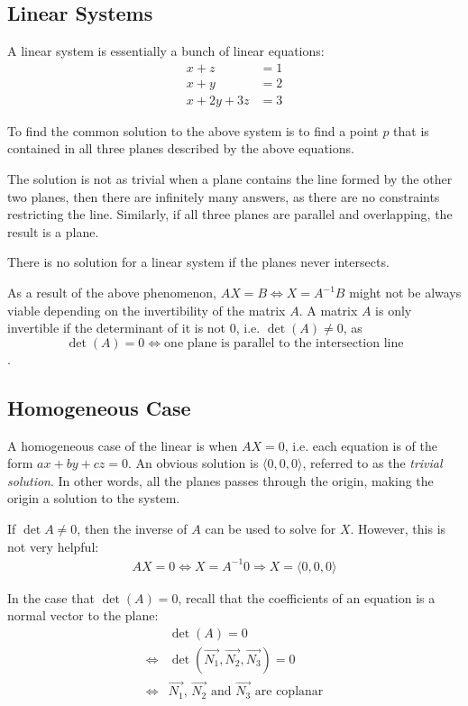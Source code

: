 \documentclass[12pt]{article}
\newcommand{\iv}[1]{\langle #1 \rangle}
\theoremstyle{definition}
\begin{document}
	\subsection{Linear Systems}
	
	A linear system is essentially a bunch of linear equations:
	\begin{align*}
		x + z &= 1 \\
		x + y &= 2 \\
		x + 2y + 3z &= 3
	\end{align*}
	
	To find the common solution to the above system is to find a point $p$ that is contained in all three planes described by the above equations.
	
	The solution is not as trivial when a plane contains the line formed by the other two planes, then there are infinitely many answers, as there are no constraints restricting the line. Similarly, if all three planes are parallel and overlapping, the result is a plane.
	
	There is no solution for a linear system if the planes never intersects.
	
	As a result of the above phenomenon, $AX = B \iff X = A^{-1}B$ might not be always viable depending on the invertibility of the matrix $A$. A matrix $A$ is only invertible if the determinant of it is not $0$, i.e. $\det(A) \neq 0$, as $$\det(A) = 0 \iff \text{one plane is parallel to the intersection line}$$.
	
	\subsection{Homogeneous Case}
	
	A homogeneous case of the linear is when $AX = 0$, i.e. each equation is of the form $ax + by + cz = 0$. An obvious solution is $\iv{0, 0, 0}$, referred to as the \emph{trivial solution}. In other words, all the planes passes through the origin, making the origin a solution to the system.
	
	If $\det{A} \neq 0$, then the inverse of $A$ can be used to solve for $X$. However, this is not very helpful:
	\begin{gather*}
		AX = 0 \iff X = A^{-1}0 \Rightarrow X = \iv{0, 0, 0}
	\end{gather*}
	
	In the case that $\det(A) = 0$, recall that the coefficients of an equation is a normal vector to the plane:
	\begin{align*}
		&\det(A) = 0 \\
		\iff &\det(\vec{N_1}, \vec{N_2}, \vec{N_3}) = 0 \\
		\iff &\text{$\vec{N_1}$, $\vec{N_2}$ and $\vec{N_3}$ are coplanar}
	\end{align*}
	
\end{document}
